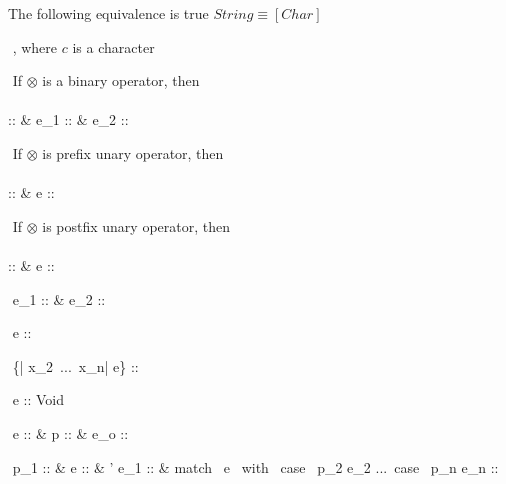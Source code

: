 \documentclass[12pt]{article}
\begin{document}
The following equivalence is true $String \equiv [Char]$

$ $\newline
{}
      {}
,\,\,where $c$ is a character

$ $\newline
If $\otimes$ is a binary operator, then\\\\
      {\Gamma \vdash \otimes :: \alpha \shortrightarrow \beta \shortrightarrow \tau 
      & \Gamma \vdash e_1 :: \alpha & \Gamma \vdash e_2 :: \beta}

$ $\newline
If $\otimes$ is prefix unary operator, then\\\\
      {\Gamma \vdash \otimes :: \alpha \shortrightarrow \tau 
      & \Gamma \vdash e :: \alpha}

$ $\newline
If $\otimes$ is postfix unary operator, then\\\\
    {\Gamma \vdash \otimes :: \alpha \shortrightarrow \tau 
    & \Gamma \vdash e :: \alpha}

$ $\newline
{}
      {\Gamma \vdash e_1 :: \alpha
      &  \vdash e_2 :: \tau}

$ $\newline
{}
      {\vdash e :: \beta }

$ $\newline
{}
      { \vdash \{| x_2\, ...\, x_n|\,\,e\} :: \beta}

$ $\newline 
{}
      {\Gamma \vdash e :: Void}

$ $\newline 
{}
      {\Gamma \vdash e :: \alpha
      & \Gamma \vdash p :: \alpha
      & \Gamma \vdash e_o :: \tau}

$ $\newline
{}
      {\Gamma \vdash p_1 :: \alpha
      & \Gamma \vdash e :: \alpha
      & \Gamma' \vdash e_1 :: \tau
      & match \, e \, with \, case \, p_2 \Rightarrow e_2\,\,...\,
                              case \, p_n \Rightarrow e_n :: \tau}
\end{document}
